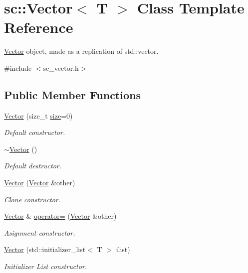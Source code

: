 \hypertarget{classsc_1_1Vector}{}\section{sc\+:\+:Vector$<$ T $>$ Class Template Reference}
\label{classsc_1_1Vector}


\hyperlink{classsc_1_1Vector}{Vector} object, made as a replication of std\+::vector.  




{\ttfamily \#include $<$sc\+\_\+vector.\+h$>$}

\subsection*{Public Member Functions}
\begin{DoxyCompactItemize}
\item 
\hyperlink{classsc_1_1Vector_a4832f9a5721078c4d2c89370f0fd96d0}{Vector} (size\+\_\+t \hyperlink{classsc_1_1Vector_a2ccab0421fad94601e6bd5e344aa3340}{size}=0)
\begin{DoxyCompactList}\small\item\em Default constructor. \end{DoxyCompactList}\item 
\hyperlink{classsc_1_1Vector_ad02ec02278095c30e478603bc26eb225}{$\sim$\+Vector} ()
\begin{DoxyCompactList}\small\item\em Default destructor. \end{DoxyCompactList}\item 
\hyperlink{classsc_1_1Vector_a2b482471a80d2570089ad1cd68aae03e}{Vector} (\hyperlink{classsc_1_1Vector}{Vector} \&other)
\begin{DoxyCompactList}\small\item\em Clone constructor. \end{DoxyCompactList}\item 
\hyperlink{classsc_1_1Vector}{Vector} \& \hyperlink{classsc_1_1Vector_ac9e52ae9626207b75d6145d64a23edd6}{operator=} (\hyperlink{classsc_1_1Vector}{Vector} \&other)
\begin{DoxyCompactList}\small\item\em Asignment constructor. \end{DoxyCompactList}\item 
\hyperlink{classsc_1_1Vector_aa2f49c9f44fcea07c3b9ce2f7867f2fb}{Vector} (std\+::initializer\+\_\+list$<$ T $>$ ilist)
\begin{DoxyCompactList}\small\item\em Initializer List constructor. \end{DoxyCompactList}\item 

\end{DoxyCompactItemize}
